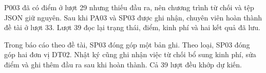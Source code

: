 \label{ev:demo-reopen}P003 đã có điểm ở lượt 29 nhưng thiếu đầu ra, nên chương trình từ chối và tệp JSON giữ nguyên. Sau khi PA03 và SP03 được ghi nhận, chuyên viên hoàn thành đề tài ở lượt 33. Lượt 39 đọc lại trạng thái, điểm, kinh phí và hai kết quả đã lưu.

Trong báo cáo theo đề tài, SP03 đóng góp một bản ghi. Theo loại, SP03 đóng góp hai đơn vị DT02. Nhật ký cũng ghi nhận việc từ chối bổ sung kinh phí, sửa điểm và ghi thêm đầu ra sau khi hoàn thành. Cả 39 lượt đều khớp dự kiến.
